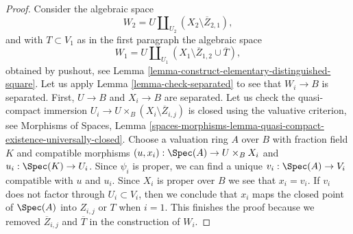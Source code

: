 \begin{proof}
\medskip\noindent
Consider the algebraic space
$$
W_2 = U \coprod\nolimits_{U_2} (X_2 \setminus \overline{Z}_{2, 1}),
$$
and with $T \subset V_1$ as in the first paragraph the algebraic space
$$
W_1 = U \coprod\nolimits_{U_1}
(X_1 \setminus \overline{Z}_{1, 2} \cup \overline{T}),
$$
obtained by pushout, see
Lemma \ref{lemma-construct-elementary-distinguished-square}.
Let us apply Lemma \ref{lemma-check-separated}
to see that $W_i \to B$ is separated. First,
$U \to B$ and $X_i \to B$ are separated. Let us check the quasi-compact
immersion $U_i \to U \times_B (X_i \setminus \overline{Z}_{i, j})$
is closed using the valuative criterion, see Morphisms of Spaces, Lemma
\ref{spaces-morphisms-lemma-quasi-compact-existence-universally-closed}.
Choose a valuation ring $A$ over $B$ with fraction field $K$ and
compatible morphisms $(u, x_i) : \Spec(A) \to U \times_B X_i$ and
$u_i : \Spec(K) \to U_i$. Since $\psi_i$ is proper, we
can find a unique $v_i : \Spec(A) \to V_i$ compatible with
$u$ and $u_i$. Since $X_i$ is proper over $B$ we see that $x_i = v_i$.
If $v_i$ does not factor through $U_i \subset V_i$, then we conclude
that $x_i$ maps the closed point of $\Spec(A)$ into $Z_{i, j}$ or
$T$ when $i = 1$. This finishes the proof because we removed
$\overline{Z}_{i, j}$ and $\overline{T}$ in the construction of $W_i$.


\end{proof}
